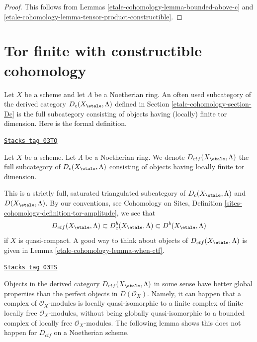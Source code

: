 \begin{proof}
This follows from Lemmas \ref{etale-cohomology-lemma-bounded-above-c} and
\ref{etale-cohomology-lemma-tensor-product-constructible}.
\end{proof}

\section{Tor finite with constructible cohomology}
\label{etale-cohomology-section-ctf}
Let $X$ be a scheme and let $\Lambda$ be a Noetherian ring. An often used
subcategory of the derived category $D_c(X_\etale, \Lambda)$ defined
in Section \ref{etale-cohomology-section-Dc} is the full subcategory consisting of objects
having (locally) finite tor dimension. Here is the formal definition.

\begin{definition}[Ctf]
\label{etale-cohomology-definition-ctf}
\href{https://stacks.math.columbia.edu/tag/03TQ}{\texttt{Stacks tag 03TQ}}

Let $X$ be a scheme. Let $\Lambda$ be a Noetherian ring. We denote
{\it $D_{ctf}(X_\etale, \Lambda)$} the full subcategory of
$D_c(X_\etale, \Lambda)$
consisting of objects having locally finite tor dimension.
\end{definition}

This is a strictly full, saturated triangulated subcategory of
$D_c(X_\etale, \Lambda)$ and $D(X_\etale, \Lambda)$. By our conventions, see
Cohomology on Sites, Definition \ref{sites-cohomology-definition-tor-amplitude},
we see that
$$
D_{ctf}(X_\etale, \Lambda) \subset D^b_c(X_\etale, \Lambda)
\subset D^b(X_\etale, \Lambda)
$$
if $X$ is quasi-compact. A good way to think about objects of
$D_{ctf}(X_\etale, \Lambda)$ is given in Lemma \ref{etale-cohomology-lemma-when-ctf}.

\begin{remark}[Different]
\label{etale-cohomology-remark-different}
\href{https://stacks.math.columbia.edu/tag/03TS}{\texttt{Stacks tag 03TS}}

Objects in the derived category $D_{ctf}(X_\etale, \Lambda)$ in some sense have
better global properties than the perfect objects in  $D(\mathcal{O}_X)$.
Namely, it can happen that a complex of $\mathcal{O}_X$-modules
is locally quasi-isomorphic to a finite complex of finite locally free
$\mathcal{O}_X$-modules, without being
globally quasi-isomorphic to a bounded complex of locally free
$\mathcal{O}_X$-modules. The following lemma shows this does not
happen for $D_{ctf}$ on a Noetherian scheme.
\end{remark}


